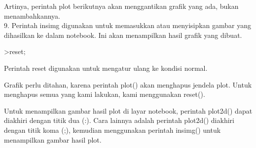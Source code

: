 \documentclass{article}
\begin{document}
\begin{eulernotebook}
\begin{eulercomment}
\begin{eulercomment}
\begin{eulercomment}
Artinya, perintah plot berikutnya akan menggantikan grafik yang ada,
bukan menambahkannya.\\
9. Perintah insimg digunakan untuk memasukkan atau menyisipkan gambar
yang dihasilkan ke dalam notebook. Ini akan menampilkan hasil grafik
yang dibuat.
\end{eulercomment}
\begin{eulerprompt}
>reset;
\end{eulerprompt}
\begin{eulercomment}
Perintah reset digunakan untuk mengatur ulang ke kondisi normal.

Grafik perlu ditahan, karena perintah plot() akan menghapus jendela
plot. Untuk menghapus semua yang kami lakukan, kami menggunakan
reset().

Untuk menampilkan gambar hasil plot di layar notebook, perintah
plot2d() dapat diakhiri dengan titik dua (:). Cara lainnya adalah
perintah plot2d() diakhiri dengan titik koma (;), kemudian menggunakan
perintah insimg() untuk menampilkan gambar hasil plot.


\end{eulercomment}
\end{eulercomment}
\end{eulercomment}
\end{eulernotebook}
\end{document}
